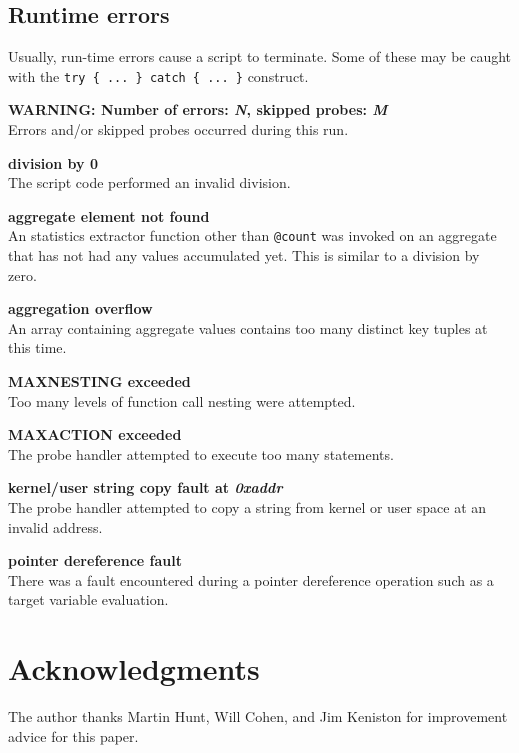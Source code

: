 \documentclass{article}
\renewcommand{\nomenclature}[2]{}
\begin{document}
\subsection{Runtime errors}

Usually, run-time errors cause a script to terminate.  Some of these
may be caught with the \verb+try { ... } catch { ... }+ construct.

\begin{description}

\item{\bf WARNING: Number of errors: {\em N}, skipped probes: {\em M}} \\
Errors and/or skipped probes occurred during this run.
\nomenclature{skipped probe}{A probe handler that should have run but
couldn't, due to contention or temporary resource problems.}

\item{\bf division by 0} \\ The script code performed an invalid
division.

\item{\bf aggregate element not found} \\ An statistics extractor
function other than \verb+@count+ was invoked on an aggregate that has
not had any values accumulated yet.  This is similar to a division by
zero.

\item{\bf aggregation overflow} \\ An array containing aggregate
values contains too many distinct key tuples at this time.

\item{\bf MAXNESTING exceeded} \\ Too many levels of function call nesting
were attempted.

\item{\bf MAXACTION exceeded} \\ The probe handler attempted to execute
too many statements.

\item{\bf kernel/user string copy fault at {\em 0xaddr}} \\
The probe handler attempted to copy a string from kernel or user space
at an invalid address. 

\item{\bf pointer dereference fault} \\ 
There was a fault encountered during a pointer dereference operation such
as a target variable evaluation.

\end{description}


\section{Acknowledgments}

The author thanks Martin Hunt, Will Cohen, and Jim Keniston for
improvement advice for this paper.
\end{document}
